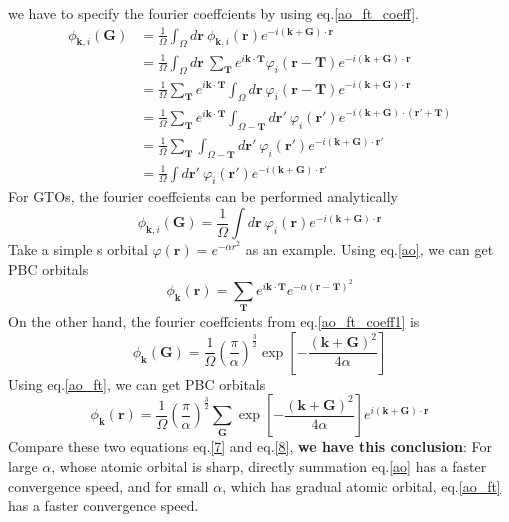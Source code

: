 \documentclass{article}
\begin{document}
    we have to specify the fourier coeffcients by using eq.\eqref{ao_ft_coeff}.
    \begin{align*}
        \phi_{\textbf{k},i}(\textbf{G}) &= \frac{1}{\Omega}\int_\Omega d\textbf{r}\ \phi_{\textbf{k},i}(\textbf{r})e^{-i(\textbf{k}+\textbf{G})\cdot\textbf{r}}\\
        &= \frac{1}{\Omega}\int_\Omega d\textbf{r}\ \sum_{\textbf{T}}e^{i\textbf{k}\cdot\textbf{T}}\varphi_i(\textbf{r}-\textbf{T})e^{-i(\textbf{k}+\textbf{G})\cdot\textbf{r}}\\
        &= \frac{1}{\Omega}\sum_{\textbf{T}}e^{i\textbf{k}\cdot\textbf{T}}\int_\Omega d\textbf{r}\ \varphi_i(\textbf{r}-\textbf{T})e^{-i(\textbf{k}+\textbf{G})\cdot\textbf{r}}\\
        &= \frac{1}{\Omega}\sum_{\textbf{T}}e^{i\textbf{k}\cdot\textbf{T}}\int_{\Omega-\textbf{T}} d\textbf{r}'\ \varphi_i(\textbf{r}')e^{-i(\textbf{k}+\textbf{G})\cdot(\textbf{r}'+\textbf{T})}\\
        &= \frac{1}{\Omega}\sum_{\textbf{T}}\int_{\Omega-\textbf{T}} d\textbf{r}'\ \varphi_i(\textbf{r}')e^{-i(\textbf{k}+\textbf{G})\cdot\textbf{r}'}\\
        &= \frac{1}{\Omega}\int d\textbf{r}'\ \varphi_i(\textbf{r}')e^{-i(\textbf{k}+\textbf{G})\cdot\textbf{r}'}
    \end{align*}
    For GTOs, the fourier coeffcients can be performed analytically
    \begin{equation}
        \phi_{\textbf{k},i}(\textbf{G}) = \frac{1}{\Omega}\int d\textbf{r}\ \varphi_i(\textbf{r})e^{-i(\textbf{k}+\textbf{G})\cdot\textbf{r}}\label{ao_ft_coeff1}
    \end{equation}
    Take a simple s orbital $\varphi(\textbf{r})=e^{-\alpha r^2}$ as an example.
    Using eq.\eqref{ao}, we can get PBC orbitals
    \begin{equation}
        \phi_{\textbf{k}}(\textbf{r}) = \sum_{\textbf{T}}e^{i\textbf{k}\cdot\textbf{T}}e^{-\alpha (\textbf{r}-\textbf{T})^2}\label{7}
    \end{equation}
    On the other hand, the fourier coeffcients from eq.\eqref{ao_ft_coeff1} is
    \begin{equation*}
        \phi_{\textbf{k}}(\textbf{G}) = \frac{1}{\Omega}\left(\frac{\pi}{\alpha}\right)^{\frac{3}{2}}\exp\left[-\frac{(\textbf{k}+\textbf{G})^2}{4\alpha}\right]
    \end{equation*}
    Using eq.\eqref{ao_ft}, we can get PBC orbitals
    \begin{equation}
        \phi_{\textbf{k}}(\textbf{r}) = \frac{1}{\Omega}\left(\frac{\pi}{\alpha}\right)^{\frac{3}{2}}\sum_{\textbf{G}}\exp\left[-\frac{(\textbf{k}+\textbf{G})^2}{4\alpha}\right]e^{i(\textbf{k}+\textbf{G})\cdot\textbf{r}}\label{8}
    \end{equation}
    Compare these two equations eq.\eqref{7} and eq.\eqref{8}, \textbf{we have this conclusion}:
    For large $\alpha$, whose atomic orbital is sharp, directly summation eq.\eqref{ao} has a faster convergence speed,
    and for small $\alpha$, which has gradual atomic orbital, eq.\eqref{ao_ft} has a faster convergence speed.
    
\end{document}
